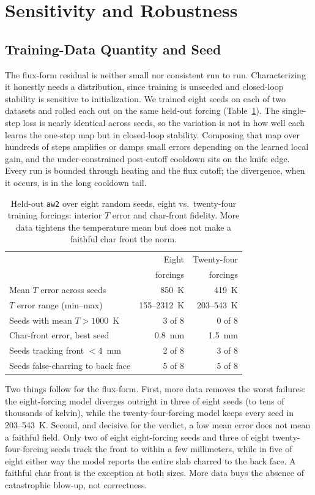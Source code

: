 \documentclass[conference]{IEEEtran}
\begin{document}
\section{Sensitivity and Robustness}
\label{sec:sens}
\subsection{Training-Data Quantity and Seed}
The flux-form residual is neither small nor consistent run to run. Characterizing it
honestly needs a distribution, since training is unseeded and closed-loop stability
is sensitive to initialization. We trained eight seeds on each of two datasets and
rolled each out on the same held-out forcing (Table~\ref{tab:seeds}). The
single-step loss is nearly identical across seeds, so the variation is not in how
well each learns the one-step map but in closed-loop stability. Composing that map
over hundreds of steps amplifies or damps small errors depending on the learned
local gain, and the under-constrained post-cutoff cooldown sits on the knife edge.
Every run is bounded through heating and the flux cutoff; the divergence, when it
occurs, is in the long cooldown tail.

\begin{table}[t]
\caption{Held-out \texttt{aw2} over eight random seeds, eight vs.\ twenty-four
training forcings: interior $T$ error and char-front fidelity. More data tightens
the temperature mean but does not make a faithful char front the norm.}
\label{tab:seeds}
\centering
\begin{tabular}{lrr}
\toprule
 & Eight & Twenty-four \\
 & forcings & forcings \\
\midrule
Mean $T$ error across seeds       & 850~K       & 419~K \\
$T$ error range (min--max)        & 155--2312~K & 203--543~K \\
Seeds with mean $T > 1000$~K      & 3 of 8      & 0 of 8 \\
Char-front error, best seed       & 0.8~mm      & 1.5~mm \\
Seeds tracking front $<4$~mm      & 2 of 8      & 3 of 8 \\
Seeds false-charring to back face & 5 of 8      & 5 of 8 \\
\bottomrule
\end{tabular}
\end{table}

Two things follow for the flux-form. First, more data removes the worst failures:
the eight-forcing model diverges outright in three of eight seeds (to tens of
thousands of kelvin), while the twenty-four-forcing model keeps every seed in
203--543~K. Second, and decisive for the verdict, a low mean error does not mean a
faithful field. Only two of eight eight-forcing seeds and three of eight
twenty-four-forcing seeds track the front to within a few millimeters, while in five
of eight either way the model reports the entire slab charred to the back face. A
faithful char front is the exception at both sizes. More data buys the absence of
catastrophic blow-up, not correctness.
\end{document}
